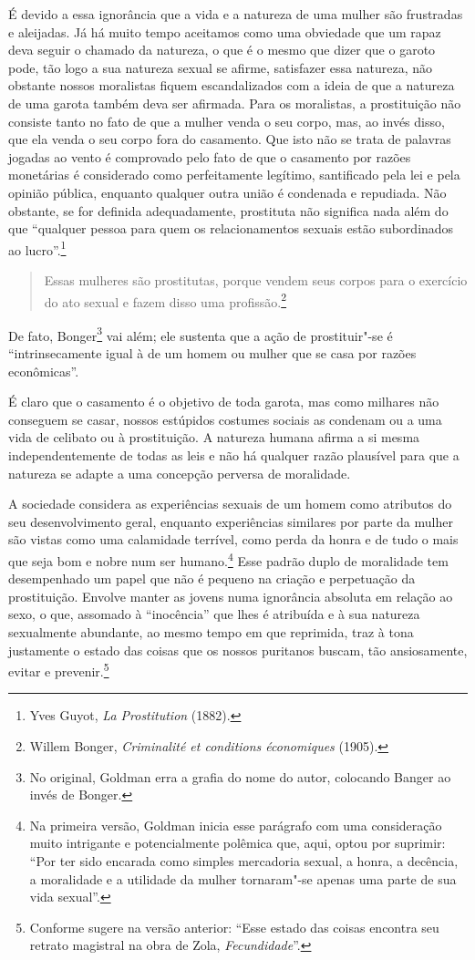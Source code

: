 É devido a essa ignorância que a vida e a natureza de uma mulher são
frustradas e aleijadas. Já há muito tempo aceitamos como uma obviedade
que um rapaz deva seguir o chamado da natureza, o que é o mesmo que
dizer que o garoto pode, tão logo a sua natureza sexual se afirme,
satisfazer essa natureza, não obstante nossos moralistas fiquem
escandalizados com a ideia de que a natureza de uma garota também deva
ser afirmada. Para os moralistas, a prostituição não consiste tanto no
fato de que a mulher venda o seu corpo, mas, ao invés disso, que ela
venda o seu corpo fora do casamento. Que isto não se trata de
palavras jogadas ao vento é comprovado pelo fato de que o casamento por razões
monetárias é considerado como perfeitamente legítimo, santificado pela
lei e pela opinião pública, enquanto qualquer outra união é condenada e
repudiada. Não obstante, se for definida adequadamente, prostituta
não significa nada além do que ``qualquer pessoa para quem os
relacionamentos sexuais estão subordinados ao lucro''.\footnote{Yves
  Guyot, \emph{La Prostitution} (1882).}

\begin{quote}
Essas mulheres são prostitutas, porque vendem seus corpos para o
exercício do ato sexual e fazem disso uma profissão.\footnote{Willem
  Bonger, \emph{Criminalité et conditions économiques} (1905).}
  \end{quote}

De fato, Bonger\footnote{No original, Goldman erra a grafia do nome do
  autor, colocando Banger ao invés de Bonger.} vai além; ele sustenta
que a ação de prostituir"-se é ``intrinsecamente igual à de um homem ou
mulher que se casa por razões econômicas''.

É claro que o casamento é o objetivo de toda garota, mas como milhares
não conseguem se casar, nossos estúpidos costumes sociais as condenam ou a
uma vida de celibato ou à prostituição. A natureza humana afirma a si
mesma independentemente de todas as leis e não há qualquer razão
plausível para que a natureza se adapte a uma concepção perversa de
moralidade.

A sociedade considera as experiências sexuais de um homem como atributos
do seu desenvolvimento geral, enquanto experiências similares por parte
da mulher são vistas como uma calamidade terrível, como perda da honra e
de tudo o mais que seja bom e nobre num ser humano.\footnote{Na primeira
  versão, Goldman inicia esse parágrafo com uma consideração muito
  intrigante e potencialmente polêmica que, aqui, optou por suprimir:
  ``Por ter sido encarada como simples mercadoria sexual, a honra, a
  decência, a moralidade e a utilidade da mulher tornaram"-se apenas uma
  parte de sua vida sexual''.} Esse padrão duplo de moralidade tem
desempenhado um papel que não é pequeno na criação e perpetuação da
prostituição. Envolve manter as jovens numa ignorância absoluta em relação ao sexo, o que, assomado à  ``inocência'' que lhes é atribuída e à sua natureza sexualmente abundante, ao mesmo tempo em que reprimida, traz à tona justamente o estado das coisas que os nossos puritanos buscam, tão ansiosamente, evitar e prevenir.\footnote{Conforme sugere na versão anterior:
  ``Esse estado das coisas encontra seu retrato magistral na obra de
  Zola, \emph{Fecundidade}''.}


